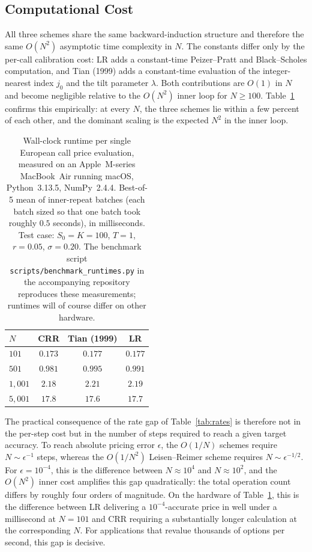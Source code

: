 \documentclass[11pt,a4paper]{article}
\theoremstyle{plain}
\theoremstyle{definition}
\begin{document}
\subsection{Computational Cost}
\label{subsec:cost}

All three schemes share the same backward-induction structure and
therefore the same $O(N^2)$ asymptotic time complexity in $N$. The
constants differ only by the per-call calibration cost: LR adds a
constant-time Peizer--Pratt and Black--Scholes computation, and Tian
(1999) adds a constant-time evaluation of the integer-nearest index
$j_0$ and the tilt parameter $\lambda$. Both contributions are
$O(1)$ in $N$ and become negligible relative to the $O(N^2)$ inner
loop for $N \geq 100$. Table~\ref{tab:runtime} confirms this
empirically: at every $N$, the three schemes lie within a few
percent of each other, and the dominant scaling is the expected
$N^2$ in the inner loop.

\begin{table}[H]
    \centering
    \caption{Wall-clock runtime per single European call price
    evaluation, measured on an Apple~M-series MacBook~Air running
    macOS, Python~3.13.5, NumPy~2.4.4. Best-of-5 mean of inner-repeat
    batches (each batch sized so that one batch took roughly $0.5$
    seconds), in milliseconds. Test case: $S_0 = K = 100$, $T = 1$,
    $r = 0.05$, $\sigma = 0.20$. The benchmark script
    \texttt{scripts/benchmark\_runtimes.py} in the accompanying
    repository reproduces these measurements; runtimes will of
    course differ on other hardware.}
    \label{tab:runtime}
    \begin{tabular}{lccc}
        \hline
        $N$ & CRR & Tian (1999) & LR \\
        \hline
        $101$ & $0.173$ & $0.177$ & $0.177$ \\
        $501$ & $0.981$ & $0.995$ & $0.991$ \\
        $1{,}001$ & $2.18$ & $2.21$ & $2.19$ \\
        $5{,}001$ & $17.8$ & $17.6$ & $17.7$ \\
        \hline
    \end{tabular}
\end{table}

The practical consequence of the rate gap of Table~\ref{tab:rates}
is therefore not in the per-step cost but in the number of steps
required to reach a given target accuracy. To reach absolute pricing
error $\epsilon$, the $O(1/N)$ schemes require $N \sim \epsilon^{-1}$
steps, whereas the $O(1/N^2)$ Leisen--Reimer scheme requires
$N \sim \epsilon^{-1/2}$. For $\epsilon = 10^{-4}$, this is the
difference between $N \approx 10^4$ and $N \approx 10^2$, and the
$O(N^2)$ inner cost amplifies this gap quadratically: the total
operation count differs by roughly four orders of magnitude. On the
hardware of Table~\ref{tab:runtime}, this is the difference between
LR delivering a $10^{-4}$-accurate price in well under a millisecond
at $N = 101$ and CRR requiring a substantially longer
calculation at the corresponding $N$. For applications that revalue
thousands of options per second, this gap is decisive.
\end{document}
